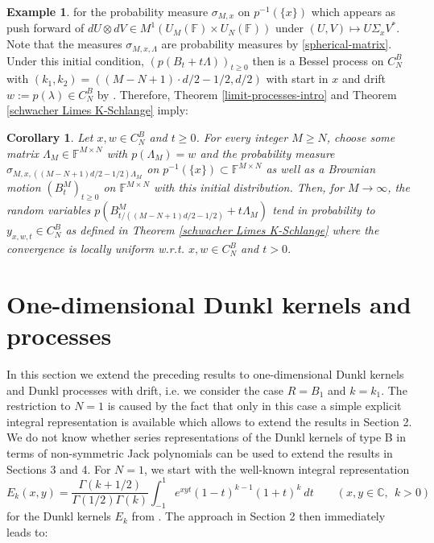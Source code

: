 \documentclass[reqno]{amsart}
\theoremstyle{plain}
\newtheorem{corollary}[theorem]{Corollary}
\theoremstyle{definition}
\newtheorem{example}[theorem]{Example}
\numberwithin{equation}{section}
\newcommand{\F}{\mathbb{F}}
\begin{document}
\begin{example}
for  the probability measure  $\sigma_{M,x}$ on $p^{-1}(\{x\}) $ which appears as push forward of
$dU\otimes dV\in M^1(U_M(\F)\times U_N(\F))$ under $(U,V)\mapsto U \Sigma_x V^* $.
Note that the measures $\sigma_{M,x,\Lambda}$ are probability measures by \eqref{spherical-matrix}.
Under this initial condition,  $(p(B_t+t\Lambda))_{t\ge0}$ then is a Bessel process on $C_N^B$
with $(k_1,k_2)=((M-N+1) \cdot d/2 - 1/2, d/2)$
with start in $x$ and drift 
$w:=p(\lambda)\in C_N^B$ by \cite{V2}.
Therefore, Theorem \ref{limit-processes-intro} and  Theorem \ref{schwacher Limes K-Schlange} imply:
\end{example}

\begin{corollary}
  Let $x,w\in C_N^B$ and
$t \geq 0$.
For every integer $M \ge N$, choose some matrix $\Lambda_M \in \F^{M \times N}$ with $p(\Lambda_M)=w$
and the probability measure $\sigma_{M,x,((M-N+1) d/2 - 1/2)\Lambda_M}$ on $p^{-1}(\{x\}) \subset \F^{M \times N}$
as well as a Brownian motion $(B_t^M)_{t \geq 0}$ on  $\F^{M \times N}$ with this initial distribution.
Then, for $M \to \infty$, the random variables $p(B_{t/((M-N+1) d/2 - 1/2)}^M+t \Lambda_M)$
tend in probability to $y_{x,w,t}\in C_N^B$ as defined in Theorem \ref{schwacher Limes K-Schlange} 
where the convergence is locally uniform w.r.t. $x,w \in C_N^B$ and $t>0$.
\end{corollary}

\section{One-dimensional Dunkl kernels and processes}

In this section we extend the preceding results to one-dimensional Dunkl kernels and Dunkl processes with drift,
i.e. we consider the case $R=B_1$ and $k=k_1$.
The restriction to $N=1$ is caused by the fact that only in this case a simple explicit integral representation
is available which allows to extend the results in Section 2. We do not know whether series representations
of the Dunkl kernels of type B in terms of non-symmetric Jack polynomials can be used to extend
the results in Sections 3 and 4.
For $N=1$, we start with
the  well-known integral representation
\begin{equation}\label{int-rep-Dunkl-1dim}
  E_k(x,y)=\frac{\Gamma(k+1/2)}{\Gamma(1/2)\Gamma(k)}\int_{-1}^1 e^{xy t} (1-t)^{k-1}(1+t)^k \> dt\quad\quad
   (x,y\in\mathbb C, \>\>k>0)
  \end{equation}
for the Dunkl kernels  $E_k$ from \cite{R1}.
The approach in Section 2 then immediately leads to:
\end{document}
